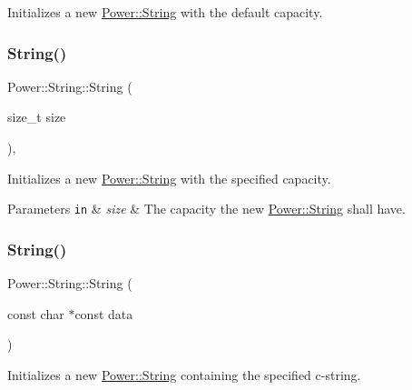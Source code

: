 Initializes a new \hyperlink{class_power_1_1_string}{Power\+::\+String} with the default capacity. 

\mbox{\label{class_power_1_1_string_a9384235fbbc6956c166abb265e60db11}} 
\subsubsection{\texorpdfstring{String()}{String()}\hspace{0.1cm}{\footnotesize\ttfamily [2/7]}}
{\footnotesize\ttfamily Power\+::\+String\+::\+String (\begin{DoxyParamCaption}\item[{size\+\_\+t}]{size }\end{DoxyParamCaption})\hspace{0.3cm}{\ttfamily [inline]}, {\ttfamily [explicit]}}



Initializes a new \hyperlink{class_power_1_1_string}{Power\+::\+String} with the specified capacity. 


\begin{DoxyParams}[1]{Parameters}
\mbox{\tt in}  & {\em size} & The capacity the new \hyperlink{class_power_1_1_string}{Power\+::\+String} shall have. \\
\hline
\end{DoxyParams}
\mbox{\label{class_power_1_1_string_aec63a74130e5abc89a1556115942a5e1}} 
\subsubsection{\texorpdfstring{String()}{String()}\hspace{0.1cm}{\footnotesize\ttfamily [3/7]}}
{\footnotesize\ttfamily Power\+::\+String\+::\+String (\begin{DoxyParamCaption}\item[{const char $\ast$const}]{data }\end{DoxyParamCaption})\hspace{0.3cm}{\ttfamily [inline]}}



Initializes a new \hyperlink{class_power_1_1_string}{Power\+::\+String} containing the specified c-\/string. 


